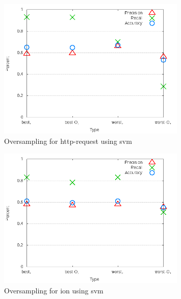 \begin{figure}[!t]
\centering
\includegraphics[width=0.8\textwidth]{images/svm/test_4/http-request_sample_range.png}
\caption{Oversampling for http-request using \gls{svm}}
\label{fig:test_4_http-request_svm}
\end{figure}

\clearpage
\begin{figure}[!t]
\centering
\includegraphics[width=0.8\textwidth]{images/svm/test_4/ion_sample_range.png}
\caption{Oversampling for ion using \gls{svm}}
\label{fig:test_4_ion_svm}
\end{figure}

